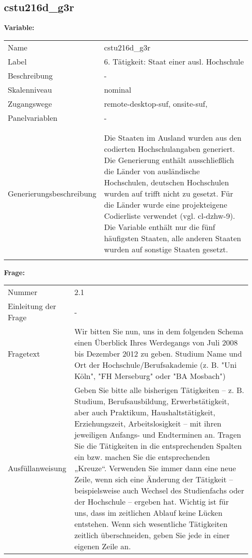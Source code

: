 	
	
	\subsection{cstu216d\_g3r}
	\label{subSection:cstu216d_g3r}

	\noindent\textbf{Variable:}\\
		\begin{tabular}{lL{11.3cm}}
			\label{tableVariable:cstu216d_g3r}
			Name & cstu216d\_g3r \\
			Label & 6. Tätigkeit: Staat einer ausl. Hochschule \\
			Beschreibung & - \\
			Skalenniveau & nominal \\
			Zugangswege &
				remote-desktop-suf,
				onsite-suf,
 \\
			Panelvariablen & -
			 \\
			 \\
 \\
					Generierungsbeschreibung & Die Staaten im Ausland wurden aus den codierten Hochschulangaben generiert. Die Generierung enthält ausschließlich die Länder von ausländische Hochschulen, deutschen Hochschulen wurden auf trifft nicht zu gesetzt. Für die Länder wurde eine projekteigene Codierliste verwendet (vgl. cl-dzhw-9). Die Variable enthält nur die fünf häufigsten Staaten, alle anderen Staaten wurden auf sonstige Staaten gesetzt. 
				 \\	
			 \\
		\end{tabular}

		\vspace*{1 cm}
		\noindent\textbf{Frage:}\\
		\begin{tabular}{lL{11.3cm}}
			\label{tableQuestion:cstu216d_g3r}
			Nummer & 2.1 \\
			Einleitung der Frage & - \\
			Fragetext & Wir bitten Sie nun, uns in dem folgenden Schema einen Überblick Ihres Werdegangs von Juli 2008 bis Dezember 2012 zu geben.
Studium
Name und Ort der Hochschule/Berufsakademie
(z. B. "Uni Köln", "FH Merseburg" oder "BA Mosbach") \\
			Ausfüllanweisung & Geben Sie bitte alle bisherigen Tätigkeiten – z. B. Studium, Berufsausbildung, Erwerbstätigkeit, aber auch Praktikum, Haushaltstätigkeit,
Erziehungszeit, Arbeitslosigkeit – mit ihren jeweiligen Anfangs- und Endterminen an. Tragen Sie die Tätigkeiten in die entsprechenden Spalten ein bzw. machen Sie die entsprechenden „Kreuze“. Verwenden Sie immer dann eine neue Zeile, wenn sich eine Änderung der Tätigkeit – beispielsweise auch Wechsel des Studienfachs oder der Hochschule – ergeben hat. Wichtig ist für uns, dass im zeitlichen Ablauf keine Lücken entstehen. Wenn sich wesentliche Tätigkeiten zeitlich überschneiden, geben Sie jede in einer eigenen Zeile an. \\
		\end{tabular}






